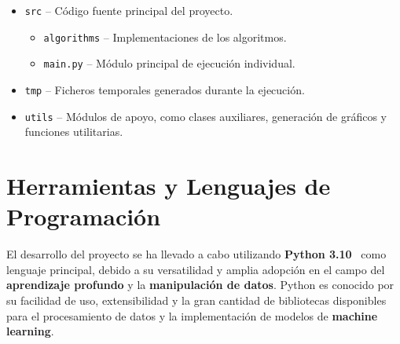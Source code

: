 \begin{itemize}
      \item \texttt{src} -- Código fuente principal del proyecto.
            \begin{itemize}
                  \item \texttt{algorithms} -- Implementaciones de los algoritmos.
                  \item \texttt{main.py} -- Módulo principal de ejecución individual.
            \end{itemize}
      \item \texttt{tmp} -- Ficheros temporales generados durante la ejecución.
      \item \texttt{utils} -- Módulos de apoyo, como clases auxiliares, generación de gráficos y funciones utilitarias.
\end{itemize}

\section{Herramientas y Lenguajes de Programación}\label{sec:herramientas-y-lenguajes-de-programacion}
El desarrollo del proyecto se ha llevado a cabo utilizando \textbf{Python 3.10}~\cite{vanderplasPythonDataScience2016} como
lenguaje principal, debido a su versatilidad y amplia adopción en el campo del \textbf{aprendizaje profundo} y la
\textbf{manipulación de datos}.
Python es conocido por su facilidad de uso, extensibilidad y la gran cantidad de bibliotecas disponibles para el
procesamiento de datos y la implementación de modelos de \textbf{machine learning}.


